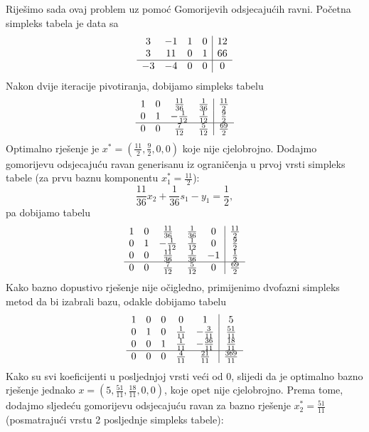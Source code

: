 \documentclass[a4paper, utf8, 11pt, colorlinks]{book}
\begin{document}
Riješimo sada ovaj problem uz pomoć Gomorijevih odsjecajućih ravni. 
Početna simpleks tabela je data sa 
$$\begin{array}{ccc c| c}
    3  & -1 & 1 &  0  & 12  \\
    3  & 11 & 0 &  1  & 66 \\ \hline
   -3  & -4 & 0 &  0  & 0
\end{array}$$
Nakon dvije iteracije pivotiranja, dobijamo simpleks tabelu 
$$\begin{array}{ccc c| c}
1 & 0 &  \frac{11}{36}   &  \frac{1}{36}  &  \frac{11}{2} \\
0 & 1 &  -\frac{1}{12}  &  \frac{1}{12}  &  \frac{9}{2}   \\ \hline
0 & 0 &  \frac{7}{12}   &  \frac{5}{12}  &  \frac{69}{2}
\end{array} $$
Optimalno rješenje je $x^* = (\frac{11}{2}, \frac{9}{2}, 0, 0)$ koje nije cjelobrojno. Dodajmo gomorijevu odsjecajuću ravan generisanu iz ograničenja u prvoj vrsti simpleks tabele (za prvu baznu komponentu $x_1^* = \frac{11}{2}$):
$$  \frac{11}{36} x_2 + \frac{1}{36} s_1 - y_1 = \frac{1}{2},$$
pa dobijamo tabelu 
$$\begin{array}{ccccc| c}
1 &  0 &   \frac{11}{36}  & \frac{1}{36}   &  0 & \frac{11}{2} \\
0 &  1 &   -\frac{1}{12}  & \frac{1}{12}   &  0 & \frac{9}{2} \\
0 &  0 &  \frac{11}{36}   &  \frac{1}{36}  & -1 & \frac{1}{2} \\ \hline
0 & 0  &  \frac{7}{12}    & \frac{5}{12}   &  0 & \frac{69}{2}
\end{array} $$
Kako bazno dopustivo rješenje nije očigledno, primijenimo dvofazni simpleks metod da bi izabrali bazu, odakle dobijamo tabelu 
$$\begin{array}{ccccc| c}
1   &   0       &   0   &   0             & 1              & 5 \\
0   &   1       &   0   &   \frac{1}{11}  & -\frac{3}{11}  & \frac{51}{11} \\
0   &   0       &   1   &   \frac{1}{11}  & -\frac{36}{11} &  \frac{18}{11} \\ \hline
0   &   0       &   0   &   \frac{4}{11}  & \frac{21}{11}  &  \frac{369}{11} \\
\end{array} $$
Kako su svi koeficijenti u posljednjoj vrsti veći od 0, slijedi da je optimalno bazno rješenje jednako $x=(5, \frac{51}{11}, \frac{18}{11}, 0, 0)$, koje opet nije cjelobrojno. 
 Prema tome, dodajmo sljedeću gomorijevu odsjecajuću ravan za bazno rješenje $x^*_2 = \frac{51}{11}$ (posmatrajući vrstu 2 posljednje simpleks tabele):
 
\end{document}
